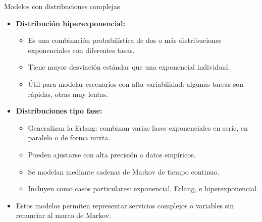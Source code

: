 \documentclass{beamer}
\begin{document}
\begin{frame}{Modelos con distribuciones complejas}
  \begin{itemize}
    \item \textbf{Distribución hiperexponencial:} \pause
    \begin{itemize}
      \item Es una combinación probabilística de dos o más distribuciones exponenciales con diferentes tasas. \pause
      \item Tiene mayor desviación estándar que una exponencial individual. \pause
      \item Útil para modelar escenarios con alta variabilidad: algunas tareas son rápidas, otras muy lentas. \pause
    \end{itemize}

    \item \textbf{Distribuciones tipo fase:} \pause
    \begin{itemize}
      \item Generalizan la Erlang: combinan varias fases exponenciales en serie, en paralelo o de forma mixta. \pause
      \item Pueden ajustarse con alta precisión a datos empíricos. \pause
      \item Se modelan mediante cadenas de Markov de tiempo continuo. \pause
      \item Incluyen como casos particulares: exponencial, Erlang, e hiperexponencial. \pause
    \end{itemize}

    \item Estos modelos permiten representar servicios complejos o variables sin renunciar al marco de Markov.
  \end{itemize}
\end{frame}
\end{document}

